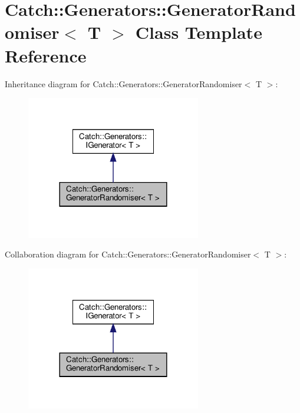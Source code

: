 \hypertarget{classCatch_1_1Generators_1_1GeneratorRandomiser}{}\section{Catch\+::Generators\+::Generator\+Randomiser$<$ T $>$ Class Template Reference}
\label{classCatch_1_1Generators_1_1GeneratorRandomiser}


Inheritance diagram for Catch\+::Generators\+::Generator\+Randomiser$<$ T $>$\+:\nopagebreak
\begin{figure}[H]
\begin{center}
\leavevmode
\includegraphics[width=216pt]{classCatch_1_1Generators_1_1GeneratorRandomiser__inherit__graph}
\end{center}
\end{figure}


Collaboration diagram for Catch\+::Generators\+::Generator\+Randomiser$<$ T $>$\+:\nopagebreak
\begin{figure}[H]
\begin{center}
\leavevmode
\includegraphics[width=216pt]{classCatch_1_1Generators_1_1GeneratorRandomiser__coll__graph}
\end{center}
\end{figure}
